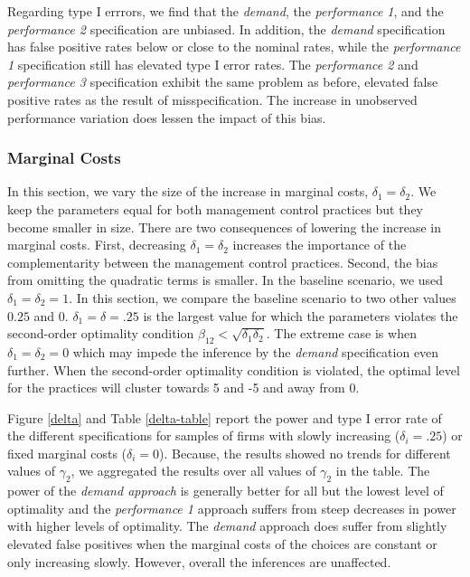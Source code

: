 \documentclass[12pt]{article}
\begin{document}
Regarding type I errrors, we find that the \emph{demand}, the \emph{performance 1}, and the \emph{performance 2} specification are unbiased. In addition, the \emph{demand} specification has false positive rates below or close to the nominal rates, while the \emph{performance 1} specification still has elevated type I error rates. The \emph{performance 2} and \emph{performance 3} specification exhibit the same problem as before, elevated false positive rates as the result of misspecification. The increase in unobserved performance variation does lessen the impact of this bias. 



\subsubsection{Marginal Costs}\label{marginal-cost}
 
In this section, we vary the size of the increase in marginal costs, $\delta_1 = \delta_2$. We keep the parameters equal for both management control practices but they become smaller in size. There are two consequences of lowering the increase in marginal costs. First, decreasing $\delta_1 = \delta_2$ increases the importance of the complementarity between the management control practices. Second, the bias from omitting the quadratic terms is smaller. In the baseline scenario, we used $\delta_1 = \delta_2 = 1$. In this section, we compare the baseline scenario to two other values $0.25$ and $0$. $\delta_1 = \delta = .25$ is the largest value for which the parameters violates the second-order optimality condition $\beta_{12} < \sqrt{\delta_1 \delta_2}$. The extreme case is when $\delta_1 = \delta_2 = 0$ which may impede the inference by the \emph{demand} specification even further. When the second-order optimality condition is violated, the optimal level for the practices will cluster towards 5 and -5 and away from  0. 

Figure \ref{delta} and Table \ref{delta-table} report the power and type I error rate of the different specifications for samples of firms with slowly increasing ($\delta_i = .25$) or fixed marginal costs ($\delta_i = 0$). Because, the results showed no trends for different values of $\gamma_2$, we aggregated the results over all values of $\gamma_2$ in the table. The power of the \emph{demand approach} is generally better for all but the lowest level of optimality and the \emph{performance 1} approach suffers from steep decreases in power with higher levels of optimality. The \emph{demand} approach does suffer from slightly elevated false positives when the marginal costs of the choices are constant or only increasing slowly. However, overall the inferences are unaffected.
\end{document}
